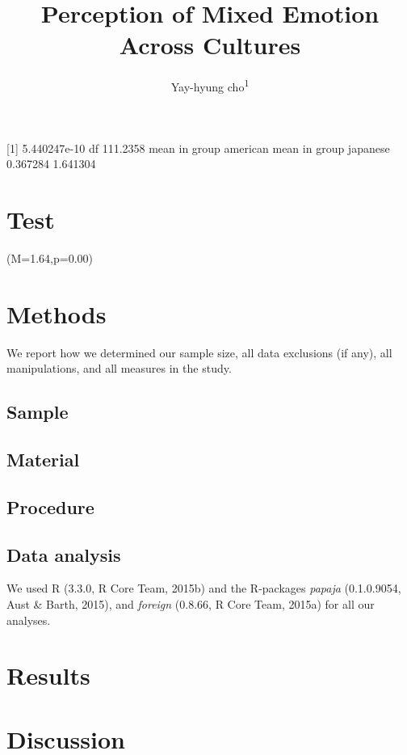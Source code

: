 \documentclass[english,man]{apa6}
\title{Perception of Mixed Emotion Across Cultures}
\author{
          Yay-hyung cho\textsuperscript{1}  }
\affiliation{
    \vspace{0.5cm}
          \textsuperscript{1} The University of Michigan  }
\begin{document}
\maketitle



{[}1{]} 5.440247e-10 df 111.2358 mean in group american mean in group
japanese 0.367284 1.641304

\section{Test}\label{test}

(M=1.64,p=0.00)

\section{Methods}\label{methods}

We report how we determined our sample size, all data exclusions (if
any), all manipulations, and all measures in the study.

\subsection{Sample}\label{sample}

\subsection{Material}\label{material}

\subsection{Procedure}\label{procedure}

\subsection{Data analysis}\label{data-analysis}

We used R (3.3.0, R Core Team, 2015b) and the R-packages \emph{papaja}
(0.1.0.9054, Aust \& Barth, 2015), and \emph{foreign} (0.8.66, R Core
Team, 2015a) for all our analyses.

\section{Results}\label{results}

\section{Discussion}\label{discussion}
\end{document}
